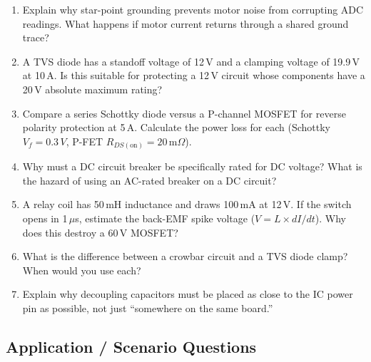 \documentclass[11pt,letterpaper,twoside,openany]{book}
\begin{document}
\begin{enumerate}[leftmargin=1.5em]
  \item Explain why star-point grounding prevents motor noise from corrupting ADC readings. What happens if motor current returns through a shared ground trace?

  \item A TVS diode has a standoff voltage of 12\,V and a clamping voltage of 19.9\,V at 10\,A. Is this suitable for protecting a 12\,V circuit whose components have a 20\,V absolute maximum rating?

  \item Compare a series Schottky diode versus a P-channel MOSFET for reverse polarity protection at 5\,A. Calculate the power loss for each (Schottky $V_f = 0.3\,V$, P-FET $R_{DS(\text{on})} = 20\,\text{m}\Omega$).

  \item Why must a DC circuit breaker be specifically rated for DC voltage? What is the hazard of using an AC-rated breaker on a DC circuit?

  \item A relay coil has 50\,mH inductance and draws 100\,mA at 12\,V. If the switch opens in 1\,$\mu$s, estimate the back-EMF spike voltage ($V = L \times dI/dt$). Why does this destroy a 60\,V MOSFET?

  \item What is the difference between a crowbar circuit and a TVS diode clamp? When would you use each?

  \item Explain why decoupling capacitors must be placed as close to the IC power pin as possible, not just ``somewhere on the same board.''
\end{enumerate}

\subsection{Application / Scenario Questions}
\end{document}
